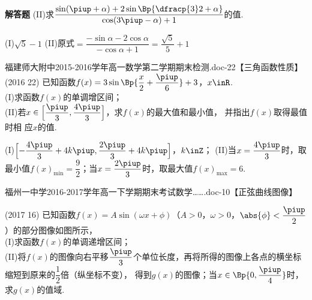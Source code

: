 \begin{exercise}{\bf 解答题}
      (II)求$\dfrac{\sin(\piup+\alpha)+2\sin\Bp{\dfracp{3}2+\alpha}}{\cos(3\piup-\alpha)+1}$的值.
      \begin{answer}
        (I)$\sqrt5-1$
        (II)原式$=\dfrac{-\sin\alpha-2\cos\alpha}{-\cos\alpha+1}=\dfrac{\sqrt5}5+1$
      \end{answer}
    \item 福建师大附中2015-2016学年高一数学第二学期期末检测.doc-22【三角函数性质】\\
      (2016  22)
      已知函数$f(x)=3\sin\Bp{\dfrac{x}2+\dfrac{\piup}6}+3$，$x\inR$.\\
      (I)求函数$f(x)$的单调增区间；\\
      (II)若$x\in\Bigl[\dfrac{\piup}3,\dfrac{4\piup}3\Bigr]$，求$f(x)$的最大值和最小值，
      并指出$f(x)$取得最值时相
      应$x$的值.
      \begin{answer}
        (I)$\Bigl[-\dfrac{4\piup}3+4k\piup,\dfrac{2\piup}3+4k\piup\Bigr]$，$k\inZ$；
        (II)当$x=\dfrac{4\piup}3$时，取最小值$f(x)_{\min}=\dfrac92$；当$x=\dfrac{2\piup}3$时，取最大值$f(x)_{\max}=6$.
      \end{answer}
    \item 福州一中学2016-2017学年高一下学期期末考试数学…….doc-10【正弦曲线图像】\\
      \begin{minipage}[t]{0.7\linewidth}
        \vspace{-1.2cm}
        (2017  16)
        已知函数$f(x)=A\sin(\omega x+\phi)$（$A>0$，$\omega>0$，$\abs{\phi}<\dfrac{\piup}2$）的部分图像如图所示，\\
        (I)求函数$f(x)$的单调递增区间；\\
        (II)将$f(x)$的图像向右平移$\dfrac{\piup}3$个单位长度，再将所得的图像上各点的横坐标缩短到原来的$\dfrac12$倍（纵坐标不变），
        得到$g(x)$的图像；当$x\in\Bp{0,\dfrac{\piup}4}$时，求$g(x)$的值域.
      \end{minipage}\hfill
      \begin{minipage}[h]{0.3\linewidth}
        \begin{center}
\end{center}
\end{minipage}
\end{exercise}
